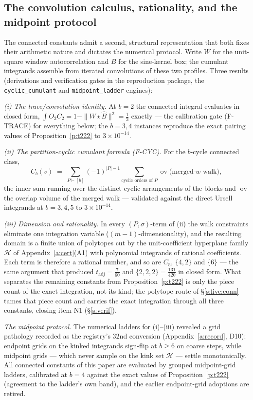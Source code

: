 \documentclass[11pt]{article}
\numberwithin{equation}{section}
\theoremstyle{definition}
\theoremstyle{remark}
\begin{document}
\subsection{The convolution calculus, rationality, and the
midpoint protocol}\label{s:conv}

The connected constants admit a second, structural
representation that both fixes their arithmetic nature and
dictates the numerical protocol. Write $W$ for the unit-square
window autocorrelation and $B$ for the sine-kernel box; the
cumulant integrands assemble from iterated convolutions of these
two profiles. Three results (derivations and verification gates
in the reproduction package, the \texttt{cyclic\_cumulant} and
\texttt{midpoint\_ladder} engines):

\emph{(i) The trace/convolution identity.} At $b=2$ the
connected integral evaluates in closed form,
$\int O_2C_2=1-\|W\star\widehat B\|^{2}=\tfrac13$ exactly ---
the calibration gate (F-TRACE) for everything below; the $b=3,4$
instances reproduce the exact pairing values of
Proposition~\ref{p:t222} to $3\times10^{-14}$.

\emph{(ii) The partition-cyclic cumulant formula (F-CYC).} For
the $b$-cycle connected class,
\[
C_b(v)\;=\;\sum_{P\vdash[b]}(-1)^{|P|-1}
\sum_{\text{cyclic orders of }P}
\operatorname{ov}\bigl(\text{merged-}w\text{ walk}\bigr),
\]
the inner sum running over the distinct cyclic arrangements of
the blocks and $\operatorname{ov}$ the overlap volume of the
merged walk --- validated against the direct Ursell integrands
at $b=3,4,5$ to $3\times10^{-14}$.

\emph{(iii) Dimension and rationality.} In every
$(P,\sigma)$-term of (ii) the walk constraints eliminate one
integration variable ($(m-1)$-dimensionality), and the resulting
domain is a finite union of polytopes cut by the unit-coefficient
hyperplane family $\mathcal H$ of Appendix~\ref{a:cert}(A1)
with polynomial integrands of rational coefficients. Each term
is therefore a rational number, and so are $C_5$, $\{4,2\}$ and
$\{6\}$ --- the same argument that produced
$t_{\mathrm{adj}}=\tfrac7{60}$ and $\{2,2,2\}=\tfrac{131}{420}$
in closed form. What separates the remaining constants from
Proposition~\ref{p:t222} is only the piece count of the exact
integration, not its kind; the polytope route of
\S\ref{s:five:conn} tames that piece count and carries the
exact integration through all three constants, closing item
N1 (\S\ref{s:verif}).

\emph{The midpoint protocol.} The numerical ladders for
(i)--(iii) revealed a grid pathology recorded as the registry's
$32$nd conversion (Appendix~\ref{a:record}, D10): endpoint
grids on the kinked integrands sign-flip at $b\ge6$ on coarse
steps, while midpoint grids --- which never sample on the kink
set $\mathcal H$ --- settle monotonically. All connected
constants of this paper are evaluated by grouped midpoint-grid
ladders, calibrated at $b=4$ against the exact values of
Proposition~\ref{p:t222} (agreement to the ladder's own band),
and the earlier endpoint-grid adoptions are retired.
\end{document}
